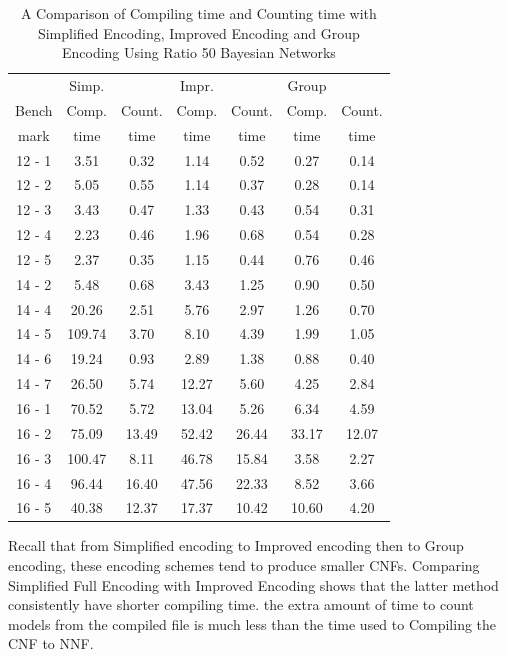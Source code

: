 \begin{table}[]
    \centering
    \begin{tabular}{ c | c c | c c | c c}
    \hline
    	    	&	Simp.	&		&	Impr. 	&	 &	Group	&		\\
   		Bench	&	Comp.	&	Count.	&	Comp. 	&	Count. &	Comp. 	&	Count.	\\
   		mark		&	time	&	time	&	time	&time	& time	&	time	\\
   	\hline
   	\hline
12	-	1	&	3.51	&	0.32	&	1.14	&	0.52	&	0.27	&	0.14	\\
12	-	2	&	5.05	&	0.55	&	1.14	&	0.37	&	0.28	&	0.14	\\
12	-	3	&	3.43	&	0.47	&	1.33	&	0.43	&	0.54	&	0.31	\\
12	-	4	&	2.23	&	0.46	&	1.96	&	0.68	&	0.54	&	0.28	\\
12	-	5	&	2.37	&	0.35	&	1.15	&	0.44	&	0.76	&	0.46	\\
14	-	2	&	5.48	&	0.68	&	3.43	&	1.25	&	0.90	&	0.50	\\
14	-	4	&	20.26	&	2.51	&	5.76	&	2.97	&	1.26	&	0.70	\\
14	-	5	&	109.74	&	3.70	&	8.10	&	4.39	&	1.99	&	1.05	\\
14	-	6	&	19.24	&	0.93	&	2.89	&	1.38	&	0.88	&	0.40	\\
14	-	7	&	26.50	&	5.74	&	12.27	&	5.60	&	4.25	&	2.84	\\
16	-	1	&	70.52	&	5.72	&	13.04	&	5.26	&	6.34	&	4.59	\\
16	-	2	&	75.09	&	13.49	&	52.42	&	26.44	&	33.17	&	12.07	\\
16	-	3	&	100.47	&	8.11	&	46.78	&	15.84	&	3.58	&	2.27	\\
16	-	4	&	96.44	&	16.40	&	47.56	&	22.33	&	8.52	&	3.66	\\
16	-	5	&	40.38	&	12.37	&	17.37	&	10.42	&	10.60	&	4.20	\\
	\hline
	\hline
    \end{tabular}
    \caption{A Comparison of Compiling time and Counting time with Simplified Encoding, Improved Encoding and Group Encoding Using Ratio 50 Bayesian Networks}
    \label{tab:comparing time}
\end{table}
Recall that from Simplified encoding to Improved encoding then to Group encoding, these encoding schemes tend to produce smaller CNFs. Comparing Simplified Full Encoding with Improved Encoding shows that the latter method consistently have shorter compiling time.  the extra amount of time to count models from the compiled file is much less than the time used to Compiling the CNF to NNF.\\

